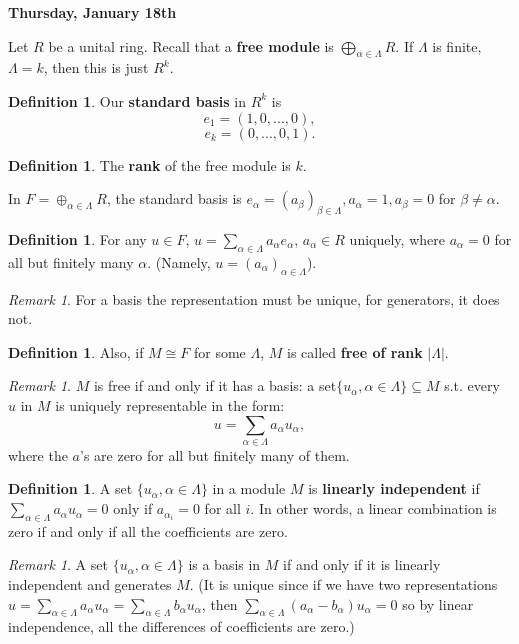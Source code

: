 \documentclass[12pt]{amsbook}
\theoremstyle{plain}
\numberwithin{section}{chapter}
\numberwithin{equation}{chapter}
\theoremstyle{definition}
\newtheorem{Def}[theorem]{Definition}
\theoremstyle{remark}
\newtheorem{rem}[theorem]{Remark}
\newcommand{\sub}{\subseteq}
\begin{document}
\vspace{5mm}
\textbf{Thursday, January 18th}

\vspace{5mm}
Let $R$ be a unital ring. Recall that a \textbf{free module} is $\bigoplus_{\alpha \in \Lambda} R$. If $\Lambda$ is finite, $\Lambda = k$, then this is just $R^k$. 
\begin{Def}
Our \textbf{standard basis} in $R^k$ is 
$$
e_1 = (1,0,...,0),
$$
$$
e_k = (0,...,0,1). 
$$
\end{Def}
\begin{Def}
The \textbf{rank} of the free module is $k$. 
\end{Def}

In $F = \oplus_{\alpha \in \Lambda} R$, the standard basis is $e_\alpha = (a_\beta)_{\beta \in \Lambda},a_\alpha = 1,a_\beta = 0$ for $\beta \neq \alpha$. 
\begin{Def}
For any $u \in F$, $u= \sum_{\alpha \in \Lambda}a_\alpha e_\alpha$, $a_\alpha \in R$ uniquely, where $a_\alpha =0$ for all but finitely many $\alpha$. (Namely, $u = (a_\alpha)_{\alpha \in \Lambda}$). 
\end{Def}

\begin{rem}
For a basis the representation must be unique, for generators, it does not. 
\end{rem}
\begin{Def}
Also, if $M \cong F$ for some $\Lambda$, $M$ is called \textbf{free of rank} $|\Lambda|$. 
\end{Def}
\begin{rem}
$M$ is free if and only if it has a basis: a set$\{u_\alpha, \alpha \in \Lambda\} \sub M$ s.t. every $u$ in $M$ is uniquely representable in the form:
$$
u= \sum_{\alpha \in \Lambda}a_\alpha u_\alpha,
$$
where the $a$'s are zero for all but finitely many of them. 
\end{rem}

\begin{Def}
A set $\{u_\alpha, \alpha \in \Lambda\}$ in a module $M$ is \textbf{linearly independent} if $\sum_{\alpha \in \Lambda}a_\alpha u_\alpha = 0$ only if $a_{\alpha_i} = 0$ for all $i$. In other words, a linear combination is zero if and only if all the coefficients are zero. 
\end{Def}

\begin{rem} \label{rem1076}
A set $\{u_\alpha, \alpha \in \Lambda\}$ is a basis in $M$ if and only if it is linearly independent and generates $M$. (It is unique since if we have two representations $u = \sum_{\alpha \in \Lambda}a_\alpha u_\alpha = \sum_{\alpha \in \Lambda}b_\alpha u_\alpha$, then $\sum_{\alpha \in \Lambda}(a_\alpha - b_\alpha) u_\alpha = 0$ so by linear independence, all the differences of coefficients are zero.)
\end{rem}
\end{document}
